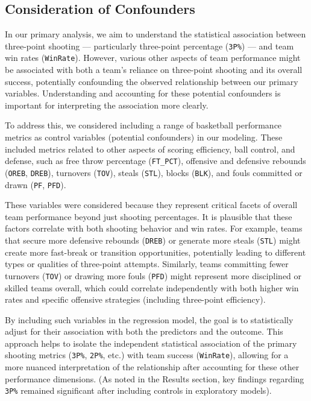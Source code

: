 \documentclass[11pt, a4paper]{article} %
\begin{document}
\subsection{Consideration of Confounders}
In our primary analysis, we aim to understand the statistical association between three-point shooting --- particularly three-point percentage (\texttt{3P\%}) --- and team win rates (\texttt{WinRate}). However, various other aspects of team performance might be associated with both a team's reliance on three-point shooting and its overall success, potentially confounding the observed relationship between our primary variables. Understanding and accounting for these potential confounders is important for interpreting the association more clearly.

To address this, we considered including a range of basketball performance metrics as control variables (potential confounders) in our modeling. These included metrics related to other aspects of scoring efficiency, ball control, and defense, such as free throw percentage (\texttt{FT\_PCT}), offensive and defensive rebounds (\texttt{OREB}, \texttt{DREB}), turnovers (\texttt{TOV}), steals (\texttt{STL}), blocks (\texttt{BLK}), and fouls committed or drawn (\texttt{PF}, \texttt{PFD}).

These variables were considered because they represent critical facets of overall team performance beyond just shooting percentages. It is plausible that these factors correlate with both shooting behavior and win rates. For example, teams that secure more defensive rebounds (\texttt{DREB}) or generate more steals (\texttt{STL}) might create more fast-break or transition opportunities, potentially leading to different types or qualities of three-point attempts. Similarly, teams committing fewer turnovers (\texttt{TOV}) or drawing more fouls (\texttt{PFD}) might represent more disciplined or skilled teams overall, which could correlate independently with both higher win rates and specific offensive strategies (including three-point efficiency).

By including such variables in the regression model, the goal is to statistically adjust for their association with both the predictors and the outcome. This approach helps to isolate the independent statistical association of the primary shooting metrics (\texttt{3P\%}, \texttt{2P\%}, etc.) with team success (\texttt{WinRate}), allowing for a more nuanced interpretation of the relationship after accounting for these other performance dimensions. (As noted in the Results section, key findings regarding \texttt{3P\%} remained significant after including controls in exploratory models).
\end{document}
